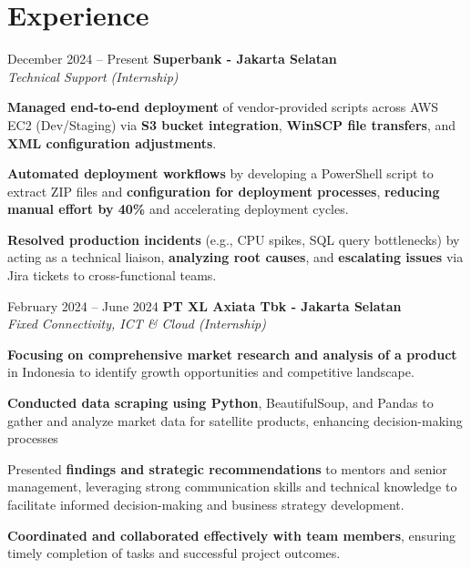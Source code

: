 \documentclass[../main.tex]{subfiles}
\begin{document}
\section{Experience}

\begin{twocolentry}{
		December 2024 – Present}
	\textbf{Superbank \color{Gray}- Jakarta Selatan}\\
	\textit{Technical Support (Internship)}
\end{twocolentry}

\vspace{0.10 cm}
\begin{onecolentry}
	\begin{highlights}
		\item \textbf{Managed end-to-end deployment} of vendor-provided scripts across AWS EC2 (Dev/Staging) via \textbf{S3 bucket integration}, \textbf{WinSCP file transfers}, and \textbf{XML configuration adjustments}.
		\item \textbf{Automated deployment workflows} by developing a PowerShell script to extract ZIP files and \textbf{configuration for deployment processes}, \textbf{reducing manual effort by 40\%} and accelerating deployment cycles.
		\item \textbf{Resolved production incidents} (e.g., CPU spikes, SQL query bottlenecks) by acting as a technical liaison, \textbf{analyzing root causes}, and \textbf{escalating issues} via Jira tickets to cross-functional teams.
	\end{highlights}
\end{onecolentry}

\vspace{0.40 cm}

\begin{twocolentry}{
		February 2024 – June 2024}
	\textbf{PT XL Axiata Tbk \color{Gray} - Jakarta Selatan}\\
	\textit{Fixed Connectivity, ICT \& Cloud (Internship)}
\end{twocolentry}

\vspace{0.10 cm}
\begin{onecolentry}
	\begin{highlights}
		\item \textbf{Focusing on comprehensive market research and analysis of a product} in Indonesia to identify growth opportunities and competitive landscape.
		\item \textbf{Conducted data scraping using Python}, BeautifulSoup, and Pandas to gather and analyze market data for satellite products, enhancing decision-making processes
		\item Presented \textbf{findings and strategic recommendations} to mentors and senior management, leveraging strong communication skills and technical knowledge to facilitate informed decision-making and business strategy development.
		\item \textbf{Coordinated and collaborated effectively with team members}, ensuring timely completion of tasks and successful project outcomes.
	\end{highlights}
\end{onecolentry}
\end{document}
